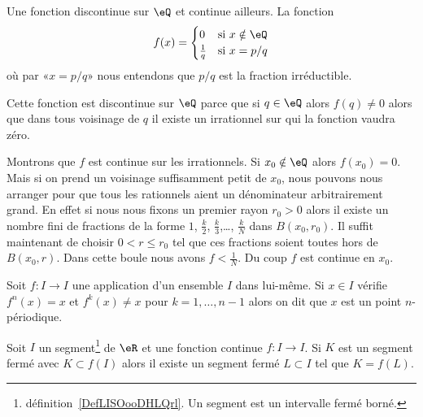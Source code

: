 \begin{example}
    Une fonction discontinue sur \( \eQ\) et continue ailleurs. La fonction
    \begin{equation}
        f(x)=\begin{cases}
            0    &   \text{si } x\notin \eQ\\
            \frac{1}{ q }    &    \text{si } x=p/q
        \end{cases}
    \end{equation}
    où par «\( x=p/q\)» nous entendons que \( p/q\) est la fraction irréductible.

    Cette fonction est discontinue sur \( \eQ\) parce que si \( q\in \eQ\) alors \( f(q)\neq 0\) alors que dans tous voisinage de \( q\) il existe un irrationnel sur qui la fonction vaudra zéro.

    Montrons que \( f\) est continue sur les irrationnels. Si \( x_0\notin \eQ\) alors \( f(x_0)=0\). Mais si on prend un voisinage suffisamment petit de \( x_0\), nous pouvons nous arranger pour que tous les rationnels aient un dénominateur arbitrairement grand. En effet si nous nous fixons un premier rayon \( r_0>0\) alors il existe un nombre fini de fractions de la forme \( 1\), \( \frac{ k }{2}\), \( \frac{ k }{ 3 }\),\ldots, \( \frac{ k }{ N }\) dans \( B(x_0,r_0)\). Il suffit maintenant de choisir \( 0<r\leq r_0\) tel que ces fractions soient toutes hors de \( B(x_0,r)\). Dans cette boule nous avons \( f<\frac{1}{ N }\). Du coup \( f\) est continue en \( x_0\).
\end{example}

\begin{definition}
    Soit \( f\colon I\to I\) une application d'un ensemble \( I\) dans lui-même. Si \( x\in I\) vérifie \( f^n(x)=x\) et \( f^k(x)\neq x\) pour \( k=1,\ldots, n-1\) alors on dit que \( x\) est un point \( n\)-périodique.
\end{definition}

\begin{lemma}       \label{LemAONBooGZBuYt}
    Soit \( I\) un segment\footnote{définition~\ref{DefLISOooDHLQrl}. Un segment est un intervalle fermé borné.} de \( \eR\) et une fonction continue \( f\colon I\to I\). Si \( K\) est un segment fermé avec \( K\subset f(I)\) alors il existe un segment fermé \( L\subset I\) tel que \( K=f(L)\).
\end{lemma}

